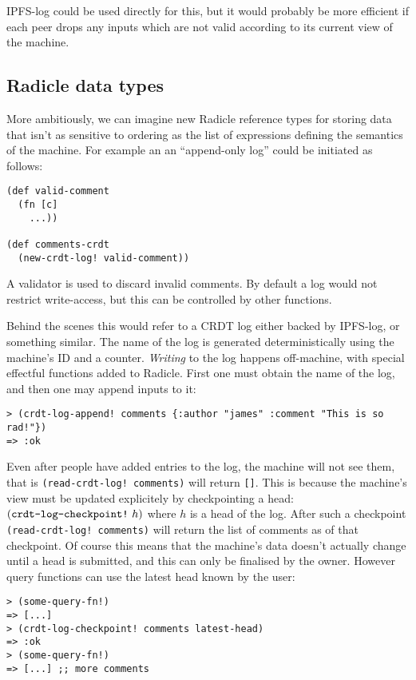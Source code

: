 \documentclass[a4paper, oneside, 10pt]{amsart}
\begin{document}
IPFS-log could be used directly for this, but it would probably be more
efficient if each peer drops any inputs which are not valid according to its
current view of the machine.

\subsection{Radicle data types}

More ambitiously, we can imagine new Radicle reference types for storing data
that isn't as sensitive to ordering as the list of expressions defining the
semantics of the machine. For example an an ``append-only log'' could be
initiated as follows:

\begin{lstlisting}
(def valid-comment
  (fn [c]
    ...))
  
(def comments-crdt
  (new-crdt-log! valid-comment))
\end{lstlisting}

A validator is used to discard invalid comments. By default a log would not
restrict write-access, but this can be controlled by other functions.

Behind the scenes this would refer to a CRDT log either backed by IPFS-log, or
something similar. The name of the log is generated deterministically using the
machine's ID and a counter. \emph{Writing} to the log happens off-machine, with
special effectful functions added to Radicle. First one must obtain the name of
the log, and then one may append inputs to it:

\begin{Verbatim}[fontsize=\small]
> (crdt-log-append! comments {:author "james" :comment "This is so rad!"})
=> :ok
\end{Verbatim}

Even after people have added entries to the log, the machine will not see them,
that is \texttt{(read-crdt-log! comments)} will return \texttt{[]}. This is
because the machine's view must be updated explicitely by checkpointing a head:
$(\text{\texttt{crdt-log-checkpoint!}} \ h)$ where $h$ is a head of the
log. After such a checkpoint \texttt{(read-crdt-log! comments)} will return the
list of comments as of that checkpoint. Of course this means that the machine's
data doesn't actually change until a head is submitted, and this can only be
finalised by the owner. However query functions can use the latest head known by
the user:

\begin{Verbatim}[fontsize=\small]
> (some-query-fn!)
=> [...]
> (crdt-log-checkpoint! comments latest-head)
=> :ok
> (some-query-fn!)
=> [...] ;; more comments
\end{Verbatim}
\end{document}
